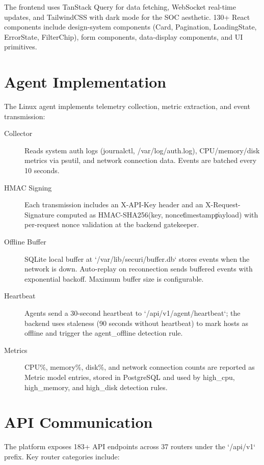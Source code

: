 The frontend uses TanStack Query for data fetching, WebSocket real-time updates, and TailwindCSS with dark mode for the SOC aesthetic. 130+ React components include design-system components (Card, Pagination, LoadingState, ErrorState, FilterChip), form components, data-display components, and UI primitives.

\section{Agent Implementation}

The Linux agent implements telemetry collection, metric extraction, and event transmission:

\begin{description}
    \item[Collector] Reads system auth logs (journalctl, /var/log/auth.log), CPU/memory/disk metrics via psutil, and network connection data. Events are batched every 10 seconds.
    \item[HMAC Signing] Each transmission includes an X-API-Key header and an X-Request-Signature computed as HMAC-SHA256(key, nonce\|timestamp\|payload) with per-request nonce validation at the backend gatekeeper.
    \item[Offline Buffer] SQLite local buffer at `/var/lib/securi/buffer.db` stores events when the network is down. Auto-replay on reconnection sends buffered events with exponential backoff. Maximum buffer size is configurable.
    \item[Heartbeat] Agents send a 30-second heartbeat to `/api/v1/agent/heartbeat`; the backend uses staleness (90 seconds without heartbeat) to mark hosts as offline and trigger the agent\_offline detection rule.
    \item[Metrics] CPU\%, memory\%, disk\%, and network connection counts are reported as Metric model entries, stored in PostgreSQL and used by high\_cpu, high\_memory, and high\_disk detection rules.
\end{description}

\section{API Communication}

The platform exposes 183+ API endpoints across 37 routers under the `/api/v1` prefix. Key router categories include:


